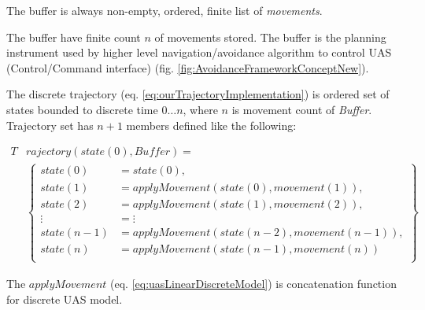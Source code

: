 \begin{assumption}
    The buffer is always non-empty, ordered, finite list of \emph{movements}.
\end{assumption}

\begin{note}
  The buffer have finite count $n$ of movements stored. The buffer is the planning instrument used by higher level navigation/avoidance algorithm to control UAS (Control/Command interface) (fig. \ref{fig:AvoidanceFrameworkConceptNew}).
\end{note}


The discrete trajectory (eq. \ref{eq:ourTrajectoryImplementation}) is ordered set of states bounded to discrete time $0\dots n$, where $n$ is movement count of \emph{Buffer}. Trajectory set has $n+1$ members defined like the following:

\begin{equation}
    \begin{aligned}
    T&rajectory(state(0),Buffer)=\\
        &\left\{
        \begin{aligned}
            state(0) &= state(0),\\
            state(1) &= apply Movement\left(state(0), movement(1)\right),  \\
            state(2) &= apply Movement\left(state(1), movement(2)\right),  \\
             \vdots  &= \vdots\\
            state(n-1) &= apply Movement\left(state(n-2), movement(n-1)\right),  \\
            state(n)   &= apply Movement\left(state(n-1), movement(n)\right)  \\
        \end{aligned}
        \right\}
    \end{aligned}
\end{equation}

\noindent The $apply Movement$ (eq. \ref{eq:uasLinearDiscreteModel}) is concatenation function for discrete UAS model.